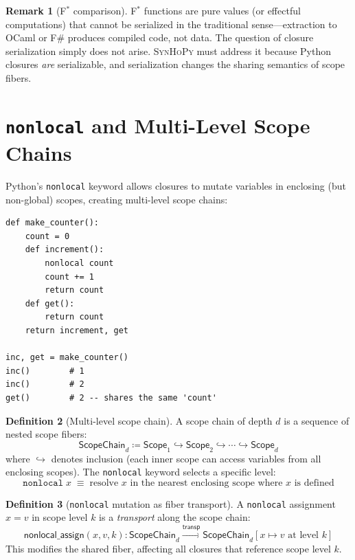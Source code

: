 \documentclass[11pt,a4paper]{report}
\theoremstyle{definition}
\newtheorem{definition}{Definition}[chapter]
\newtheorem{remark}[definition]{Remark}
\theoremstyle{plain}
\newcommand{\transp}{\mathsf{transp}}
\newcommand{\defeq}{\coloneqq}
\newcommand{\fstar}{F$^{*}$}
\newcommand{\synhopy}{\textsc{SynHoPy}}
\begin{document}
\begin{remark}[\fstar{} comparison]
\fstar{} functions are pure values (or effectful computations) that cannot
be serialized in the traditional sense---extraction to OCaml or F\#
produces compiled code, not data.  The question of closure serialization
simply does not arise.  \synhopy{} must address it because Python closures
\emph{are} serializable, and serialization changes the sharing semantics
of scope fibers.
\end{remark}

\section{\texttt{nonlocal} and Multi-Level Scope Chains}

Python's \texttt{nonlocal} keyword allows closures to mutate variables in
enclosing (but non-global) scopes, creating multi-level scope chains:

\begin{lstlisting}[style=python]
def make_counter():
    count = 0
    def increment():
        nonlocal count
        count += 1
        return count
    def get():
        return count
    return increment, get

inc, get = make_counter()
inc()        # 1
inc()        # 2
get()        # 2 -- shares the same 'count'
\end{lstlisting}

\begin{definition}[Multi-level scope chain]
A scope chain of depth $d$ is a sequence of nested scope fibers:
\[
  \mathsf{ScopeChain}_d \defeq
    \mathsf{Scope}_1 \hookrightarrow \mathsf{Scope}_2
    \hookrightarrow \cdots \hookrightarrow \mathsf{Scope}_d
\]
where $\hookrightarrow$ denotes inclusion (each inner scope can access
variables from all enclosing scopes).  The \texttt{nonlocal} keyword
selects a specific level:
\[
  \texttt{nonlocal}\;x \;\equiv\;
  \text{resolve } x \text{ in the nearest enclosing scope where } x
    \text{ is defined}
\]
\end{definition}

\begin{definition}[\texttt{nonlocal} mutation as fiber transport]
A \texttt{nonlocal} assignment $x = v$ in scope level $k$ is a
\emph{transport} along the scope chain:
\[
  \mathsf{nonlocal\_assign}(x, v, k) :
    \mathsf{ScopeChain}_d
    \xrightarrow{\transp}
    \mathsf{ScopeChain}_d[x \mapsto v \text{ at level } k]
\]
This modifies the shared fiber, affecting all closures that reference
scope level $k$.
\end{definition}
\end{document}
